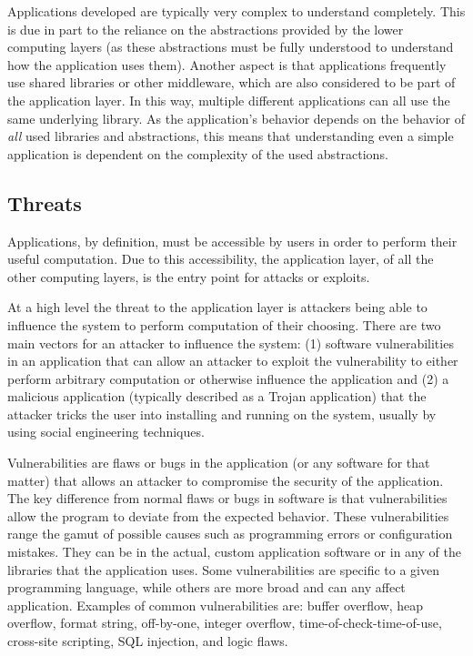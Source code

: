 \documentclass[11pt,letterpaper]{article}
\begin{document}
Applications developed are typically very complex to understand
completely. This is due in part to the reliance on the abstractions
provided by the lower computing layers (as these abstractions must be
fully understood to understand how the application uses them). Another
aspect is that applications frequently use shared libraries or other
middleware, which are also considered to be part of the application
layer. In this way, multiple different applications can all use the
same underlying library. As the application's behavior depends on the
behavior of \emph{all} used libraries and abstractions, this means
that understanding even a simple application is dependent on the
complexity of the used abstractions.

\subsection{Threats}

Applications, by definition, must be accessible by users in
order to perform their useful computation. Due to this accessibility,
the application layer, of all the other computing layers, is the entry
point for attacks or exploits. 

At a high level the threat to the application layer is attackers being
able to influence the system to perform computation of their choosing.
There are two main vectors for an attacker to influence the system:
(1) software vulnerabilities in an application that can allow an
attacker to exploit the vulnerability to either perform arbitrary
computation or otherwise influence the application and (2) a malicious
application (typically described as a Trojan application) that the
attacker tricks the user into installing and running on the system,
usually by using social engineering techniques. 

Vulnerabilities are flaws or bugs in the application (or any software
for that matter) that allows an attacker to compromise the security of
the application. The key difference from normal flaws or bugs in
software is that vulnerabilities allow the program to deviate from the expected behavior. These vulnerabilities range the gamut of possible causes
such as programming errors or configuration mistakes. They can be in
the actual, custom application software or in any of the libraries
that the application uses. Some vulnerabilities are specific to a
given programming language, while others are more broad and can any
affect application. Examples of common vulnerabilities are: buffer
overflow, heap overflow, format string, off-by-one, integer overflow,
time-of-check-time-of-use, cross-site scripting, SQL injection, and
logic flaws.
\end{document}
